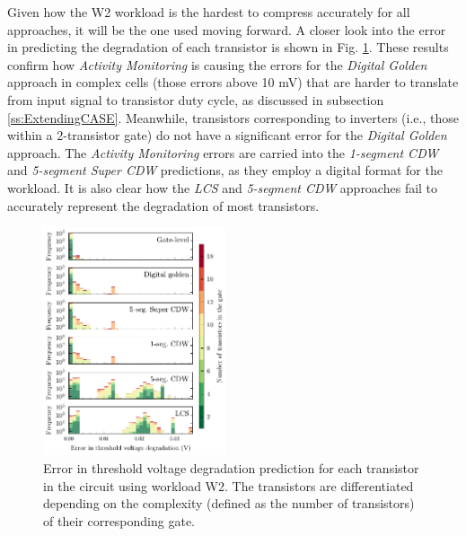 Given how the W2 workload is the hardest to compress accurately for all approaches, it will be the one used moving forward. A closer look into the error in predicting the degradation of each transistor is shown in Fig. \ref{fig:cellwise error}. These results confirm how \textit{Activity Monitoring} is causing the errors for the \textit{Digital Golden} approach in complex cells (those errors above 10 mV) that are harder to translate from input signal to transistor duty cycle, as discussed in subsection \ref{ss:ExtendingCASE}. Meanwhile, transistors corresponding to inverters (i.e., those within a 2-transistor gate) do not have a significant error for the \textit{Digital Golden} approach. The \textit{Activity Monitoring} errors are carried into the \textit{1-segment CDW} and \textit{5-segment Super CDW} predictions, as they employ a digital format for the workload. It is also clear how the \textit{LCS} and \textit{5-segment CDW} approaches fail to accurately represent the degradation of most transistors.

\begin{figure}[!t]
    \includegraphics[width=0.48\textwidth,trim={0 0 0 1mm},clip]{images/ch2/absolute_error_histogram_plot.pdf}
    \caption{Error in threshold voltage degradation prediction for each transistor in the circuit using workload W2. The transistors are differentiated depending on the complexity (defined as the number of transistors) of their corresponding gate.}
    \label{fig:cellwise error}
\end{figure}


